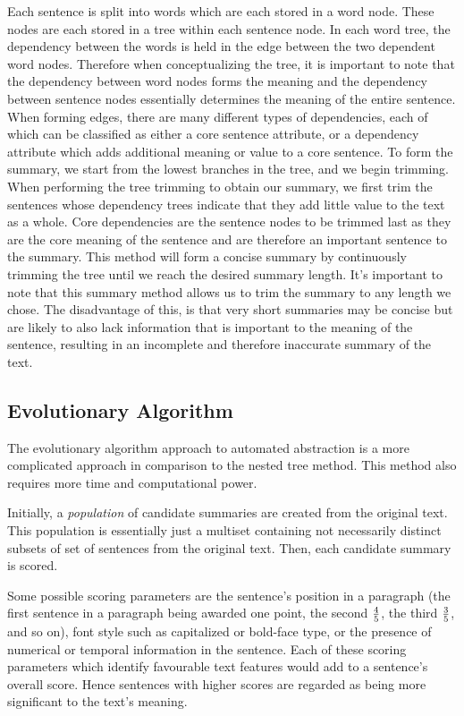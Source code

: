 Each sentence is split into words which are each stored in a word node. These nodes are each stored in a tree within each sentence node. In each word tree, the dependency between the words is held in the edge between the two dependent word nodes. 
Therefore when conceptualizing the tree, it is important to note that the dependency between word nodes forms the meaning and the dependency between sentence nodes essentially determines the meaning of the entire sentence. 
When forming edges, there are many different types of dependencies, each of which can be classified as either a core sentence attribute, or a dependency attribute which adds additional meaning or value to a core sentence. To form the summary, we start from the lowest branches in the tree, and we begin trimming. When performing the tree trimming to obtain our summary, we first trim the sentences whose dependency trees indicate that they add little value to the text as a whole. Core dependencies are the sentence nodes to be trimmed last as they are the core meaning of the sentence and are therefore an important sentence to the summary. This method will form a concise summary by continuously trimming the tree until we reach the desired summary length. It's important to note that this summary method allows us to trim the summary to any length we chose. The disadvantage of this, is that very short summaries may be concise but are likely to also lack information that is important to the meaning of the sentence, resulting in an incomplete and therefore inaccurate summary of the text. 

\subsection{Evolutionary Algorithm}
The evolutionary algorithm approach to automated abstraction is a more complicated approach in comparison to the nested tree method. This method also requires more time and computational power.

Initially, a {\em population} of candidate summaries are created from the original text. This population is essentially just a multiset containing not necessarily distinct subsets of set of sentences from the original text.  Then, each candidate summary is scored.

Some possible scoring parameters are the sentence's position in a paragraph (the first sentence in a paragraph being awarded one point, the second $4 \over 5$, the third $3\over 5$, and so on), font style such as capitalized or bold-face type, or the presence of numerical or temporal information in the sentence. Each of these scoring parameters which identify favourable text features would add to a sentence's overall score. Hence sentences with higher scores are regarded as being more significant to the text's meaning.

